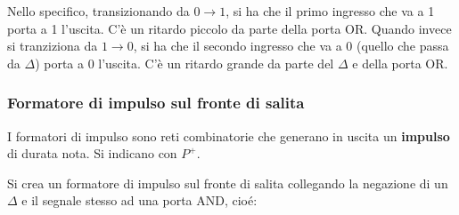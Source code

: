 \documentclass[a4paper,11pt]{article}
\begin{document}
Nello specifico, transizionando da $0 \rightarrow 1$, si ha che il primo ingresso che va a 1 porta a 1 l'uscita. C'è un ritardo piccolo da parte della porta OR.
Quando invece si tranziziona da $1 \rightarrow 0$, si ha che il secondo ingresso che va a 0 (quello che passa da $\Delta$) porta a 0 l'uscita. C'è un ritardo grande da parte del $\Delta$ e della porta OR.

\subsubsection{Formatore di impulso sul fronte di salita}
I formatori di impulso sono reti combinatorie che generano in uscita un \textbf{impulso} di durata nota.
Si indicano con $P^+$.

Si crea un formatore di impulso sul fronte di salita collegando la negazione di un $\Delta$ e il segnale stesso ad una porta AND, cioé:
\end{document}
